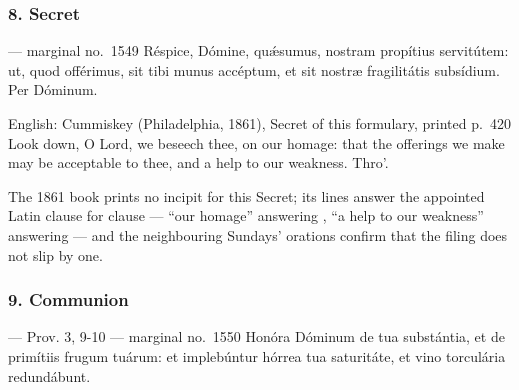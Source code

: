 
\elementguard
\subsubsection*{8. Secret }

\begin{appointedlatin}{ --- marginal no.\ 1549}
Réspice, Dómine, quǽsumus, nostram propítius servitútem: ut, quod offérimus,
sit tibi munus accéptum, et sit nostræ fragilitátis subsídium. Per Dóminum.
\end{appointedlatin}

\begin{namedtranslation}{English: Cummiskey (Philadelphia, 1861), Secret of this formulary, printed p.~420}
Look down, O Lord, we beseech thee, on our homage: that the offerings we make
may be acceptable to thee, and a help to our weakness. Thro'.
\end{namedtranslation}

The 1861 book prints no incipit for this Secret; its lines answer the
appointed Latin clause for clause --- ``our homage'' answering , ``a help to our weakness'' answering  --- and the neighbouring Sundays' orations confirm that
the filing does not slip by one.


\elementguard
\subsubsection*{9. Communion }

\begin{appointedlatin}{ --- Prov. 3, 9-10 --- marginal no.\ 1550}
Honóra Dóminum de tua substántia, et de primítiis frugum tuárum: et
implebúntur hórrea tua saturitáte, et vino torculária redundábunt.
\end{appointedlatin}

